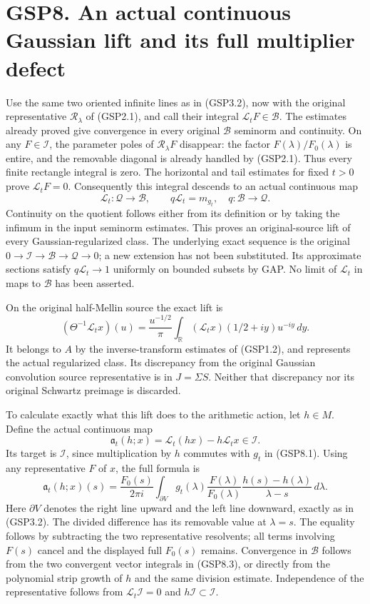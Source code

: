 \section{GSP8. An actual continuous Gaussian lift and its full
multiplier
defect}\label{gsp8.-an-actual-continuous-gaussian-lift-and-its-full-multiplier-defect}

Use the same two oriented infinite lines as in (GSP3.2), now with the
original representative \(\mathscr R_\lambda\) of (GSP2.1), and call
their integral \(\mathscr L_tF\in\mathcal B\). The estimates already
proved give convergence in every original \(\mathcal B\) seminorm and
continuity. On any \(F\in\mathcal I\), the parameter poles of
\(\mathscr R_\lambda F\) disappear: the factor
\(F(\lambda)/F_0(\lambda)\) is entire, and the removable diagonal is
already handled by (GSP2.1). Thus every finite rectangle integral is
zero. The horizontal and tail estimates for fixed \(t>0\) prove
\(\mathscr L_tF=0\). Consequently this integral descends to an actual
continuous map \[
\mathcal L_t:\mathcal Q\longrightarrow\mathcal B,\qquad
q\mathcal L_t=m_{g_t},\quad q:\mathcal B\to\mathcal Q.
\tag{GSP8.1}
\] Continuity on the quotient follows either from its definition or by
taking the infimum in the input seminorm estimates. This proves an
original-source lift of every Gaussian-regularized class. The underlying
exact sequence is the original
\(0\to\mathcal I\to\mathcal B\to\mathcal Q\to0\); a new extension has
not been substituted. Its approximate sections satisfy
\(q\mathcal L_t\to1\) uniformly on bounded subsets by GAP. No limit of
\(\mathcal L_t\) in maps to \(\mathcal B\) has been asserted.

On the original half-Mellin source the exact lift is \[
(\Theta^{-1}\mathcal L_tx)(u)=\frac{u^{-1/2}}\pi
\int_{\mathbb R}(\mathcal L_tx)(1/2+iy)u^{-iy}\,dy.
\tag{GSP8.2}
\] It belongs to \(A\) by the inverse-transform estimates of (GSP1.2),
and represents the actual regularized class. Its discrepancy from the
original Gaussian convolution source representative is in
\(J=\Sigma S\). Neither that discrepancy nor its original Schwartz
preimage is discarded.

To calculate exactly what this lift does to the arithmetic action, let
\(h\in M\). Define the actual continuous map \[
\mathfrak a_t(h;x)=\mathcal L_t(hx)-h\mathcal L_tx\in\mathcal I.
\tag{GSP8.3}
\] Its target is \(\mathcal I\), since multiplication by \(h\) commutes
with \(g_t\) in (GSP8.1). Using any representative \(F\) of \(x\), the
full formula is \[
\mathfrak a_t(h;x)(s)=\frac{F_0(s)}{2\pi i}
\int_{\partial V}g_t(\lambda)\frac{F(\lambda)}{F_0(\lambda)}
\frac{h(s)-h(\lambda)}{\lambda-s}\,d\lambda.
\tag{GSP8.4}
\] Here \(\partial V\) denotes the right line upward and the left line
downward, exactly as in (GSP3.2). The divided difference has its
removable value at \(\lambda=s\). The equality follows by subtracting
the two representative resolvents; all terms involving \(F(s)\) cancel
and the displayed full \(F_0(s)\) remains. Convergence in \(\mathcal B\)
follows from the two convergent vector integrals in (GSP8.3), or
directly from the polynomial strip growth of \(h\) and the same division
estimate. Independence of the representative follows from
\(\mathscr L_t\mathcal I=0\) and \(h\mathcal I\subset\mathcal I\).

